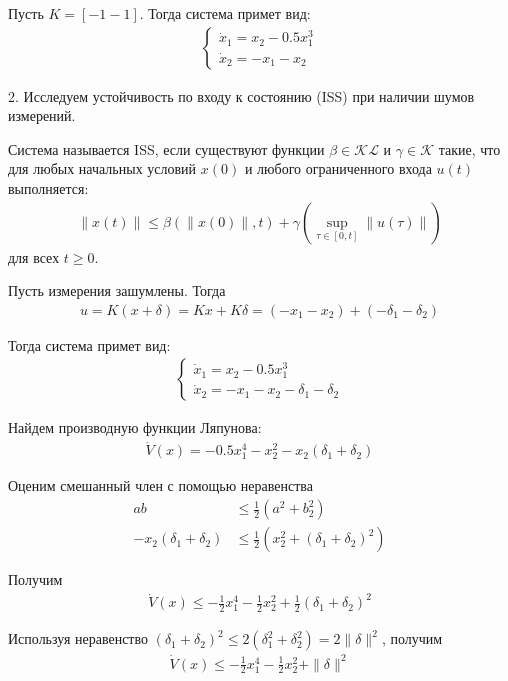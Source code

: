 Пусть $K = [-1 -1]$. Тогда система примет вид:
\begin{align*}
    \begin{cases}
        \dot{x}_1 = x_2 - 0.5x_1^3 \\
        \dot{x}_2 = -x_1 - x_2
    \end{cases}
\end{align*}

2. Исследуем устойчивость по входу к состоянию (ISS) при наличии
шумов измерений.

Система называется ISS, если существуют функции
$\beta \in \mathcal{KL}$ и $\gamma \in \mathcal{K}$
такие, что для любых начальных условий $x(0)$ и любого 
ограниченного входа $u(t)$ выполняется:
\begin{align*}
    \|x(t)\| \le \beta(\|x(0)\|, t) + \gamma\left(\sup_{\tau \in [0,t]} \|u(\tau)\|\right)
\end{align*}
для всех $t \ge 0$.

Пусть измерения зашумлены. Тогда
\begin{align*}
    u = K(x + \delta) = Kx + K\delta = (-x_1 - x_2) + (-\delta_1 - \delta_2)
\end{align*}

Тогда система примет вид:
\begin{align*}
    \begin{cases}
        \dot{x}_1 = x_2 - 0.5x_1^3 \\
        \dot{x}_2 = -x_1 - x_2 - \delta_1 - \delta_2
    \end{cases}
\end{align*}

Найдем производную функции Ляпунова:
\begin{align*}
    \dot{V}(x) = -0.5x_1^4 - x_2^2 - x_2(\delta_1 + \delta_2)
\end{align*}

Оценим смешанный член с помощью неравенства
\begin{align*}
    ab &\le \frac{1}{2} \left( a^2 + b_2^2 \right)\\
    -x_2(\delta_1 + \delta_2) &\le \frac{1}{2} \left(x_2^2 + (\delta_1 + \delta_2)^2 \right)
\end{align*}

Получим
\begin{align*}
    \dot{V}(x) \le -\frac{1}{2}x_1^4 - \frac{1}{2}x_2^2 + \frac{1}{2} (\delta_1 + \delta_2)^2
\end{align*}

Используя неравенство $(\delta_1+\delta_2)^2 \le 2(\delta_1^2 + \delta_2^2) = 2\|\delta\|^2$, получим
\begin{align*}
    \dot{V}(x) \le -\frac{1}{2}x_1^4 - \frac{1}{2}x_2^2 + \|\delta\|^2
\end{align*}

